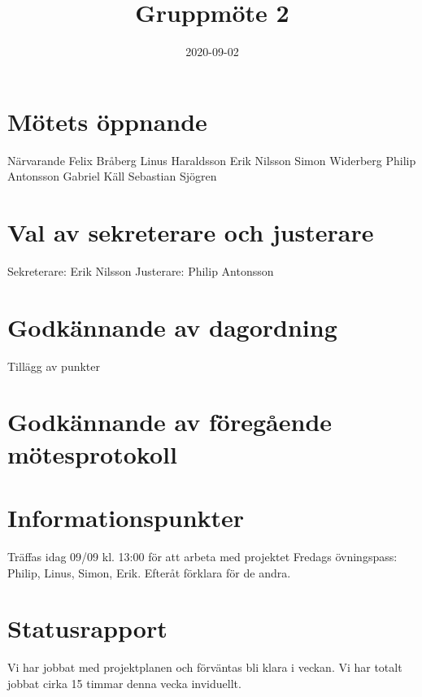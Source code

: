 \documentclass[a4paper]{article}
\begin{document}
\title{Gruppmöte 2}
\date{2020-09-02}
\maketitle

\section{Mötets öppnande}
\label{sec:roller}
Närvarande
Felix Bråberg
Linus Haraldsson
Erik Nilsson
Simon Widerberg
Philip Antonsson
Gabriel Käll
Sebastian Sjögren

\section{Val av sekreterare och justerare}
\label{sec:val}
Sekreterare: Erik Nilsson
\newline
Justerare:  Philip Antonsson


\section{Godkännande av dagordning}
\label{sec:godk}
Tillägg av punkter






\section{Godkännande av föregående mötesprotokoll}
\label{sec:godk}






\section{Informationspunkter}
\label{sec:inf}
Träffas idag 09/09 kl. 13:00 för att arbeta med projektet
Fredags övningspass: Philip, Linus, Simon, Erik. Efteråt förklara för de andra.




\section{Statusrapport}
\label{sec:stat}
Vi har jobbat med projektplanen och förväntas bli klara i veckan.
Vi har totalt jobbat cirka 15 timmar denna vecka inviduellt.


\newline \newline
\end{document}
